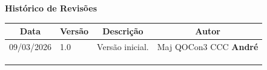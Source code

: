 \begin{table}[h]
	\begin{center}
	    \textbf{\Huge{Histórico de Revisões}}
	\end{center}
    \centering
	\begin{tabular}{|p{3cm}|p{1.5cm}|p{7.5cm}|p{3.2cm}|}
		\hline \multicolumn{1}{|c|}{\textbf{Data}} & \multicolumn{1}{|c|}{\textbf{Versão}} &
			\multicolumn{1}{|c|}{\textbf{Descrição}} & \multicolumn{1}{|c|}{\textbf{Autor}} \\ \hline
		09/03/2026 & 1.0 & Versão inicial. & Maj QOCon3 CCC \textbf{André} \\ \hline
		& & & \\ \hline
		& & & \\ \hline
		& & & \\ \hline
	\end{tabular}
\end{table}